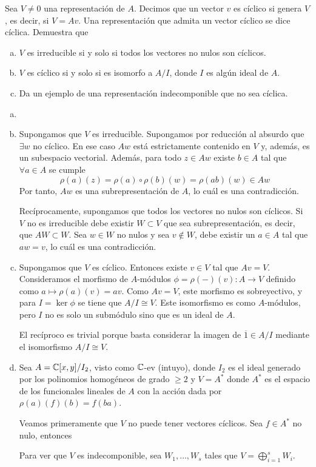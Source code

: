 \documentclass[twoside]{article}
\begin{document}
\begin{ejercicio}{1.25}\label{25}
Sea $V\neq 0$ una representación de $A$. Decimos que un vector $v$ es cíclico si genera $V$, es decir, si $V= Av$. Una representación que admita un vector cíclico se dice cíclica. Demuestra que
\begin{enumerate}[(a)]
\item $V$ es irreducible si y solo si todos los vectores no nulos son cíclicos.
\item $V$ es cíclico si y solo si es isomorfo a $A/I$, donde $I$ es algún ideal de $A$. 
\item Da un ejemplo de una representación indecomponible que no sea cíclica.

\end{enumerate}
\end{ejercicio}
\begin{solucion}
\begin{enumerate}[(a)]
\item[]
\item Supongamos que $V$ es irreducible. Supongamos por reducción al absurdo que $\exists w$ no cíclico. En ese caso $Aw$ está estrictamente contenido en $V$ y, además, es un subespacio vectorial. Además, para todo $z \in Aw$ existe $b \in A$ tal que $\forall a \in A$ se cumple
$$
\rho(a)(z) = \rho(a)\circ \rho(b) (w) = \rho(ab) (w) \in Aw
$$
Por tanto, $Aw$ es una subrepresentación de $A$, lo cuál es una contradicción.


Recíprocamente, supongamos que todos los vectores no nulos son cíclicos. Si $V$ no es irreducible debe existir $W\subset V$ que sea subrepresentación, es decir, que $AW\subset W$. Sea $w\in W$ no nulos y sea $v \notin W$, debe existir un $a \in A$ tal que $aw = v$, lo cuál es una contradicción.
\item Supongamos que $V$ es cíclico. Entonces existe $v\in V$ tal que $Av = V$. Consideramos el morfismo de $A$-módulos $\phi=\rho(-)(v):A\to V$ definido como $a\mapsto \rho(a)(v)=av$. Como $Av=V$, este morfismo es sobreyectivo, y para $I=\ker\phi$ se tiene que $A/I\cong V$. Este isomorfismo es como $A$-módulos, pero $I$ no es solo un submódulo sino que es un ideal de $A$. 

El recíproco es trivial porque basta considerar la imagen de $\overline{1}\in A/I$ mediante el isomorfismo $A/I\cong V$. 

\item Sea $A = \mathbb{C}[x,y]/I_2$, visto como $\mathbb{C}$-ev (intuyo), donde $I_2$ es el ideal generado por los polinomios homogéneos de grado $\geq 2$ y $V = A^*$ donde $A^*$ es el espacio de los funcionales lineales de $A$ con la acción dada por $\rho(a)(f)(b) = f(ba)$. 

Veamos primeramente que $V$ no puede tener vectores cíclicos. Sea $f \in A^*$ no nulo, entonces 

Para ver que $V$ es indecomponible, sea $W_1,\dotsc,W_s$ tales que $V = \bigoplus_{i=1}^s W_i$. 
\end{enumerate}
\end{solucion}
\end{document}
